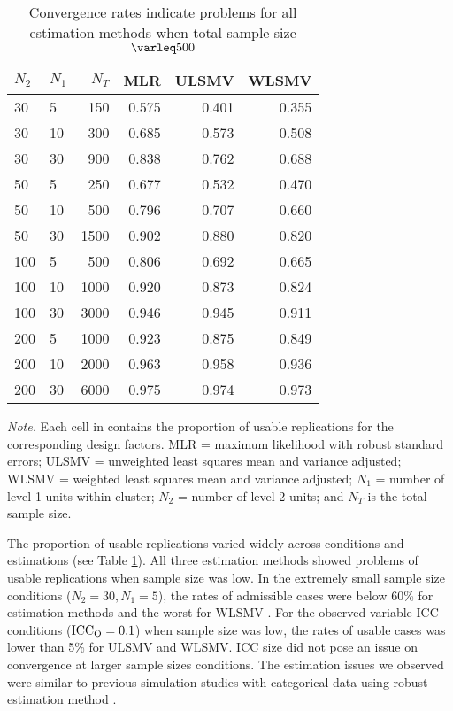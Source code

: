 \documentclass[Review,sageh,times, doublespace]{sagej}
\begin{document}
\begin{table}[ht]
 \centering
 \begin{threeparttable}
 \caption{Convergence rates indicate problems for all estimation methods when total sample size $\varleq 500$} 
 \label{tb:usable}
\begin{tabular}{llrrrr}
  \toprule
$N_2$ & $N_1$ & $N_T$ & MLR & ULSMV & WLSMV \\ 
  \midrule
   30 &    5 & 150  & 0.575 & 0.401 & 0.355 \\ 
   30 &   10 & 300  & 0.685 & 0.573 & 0.508 \\ 
   30 &   30 & 900  & 0.838 & 0.762 & 0.688 \\ 
   50 &    5 & 250  & 0.677 & 0.532 & 0.470 \\ 
   50 &   10 & 500  & 0.796 & 0.707 & 0.660 \\ 
   50 &   30 & 1500 & 0.902 & 0.880 & 0.820 \\ 
  100 &    5 & 500  & 0.806 & 0.692 & 0.665 \\ 
  100 &   10 & 1000 & 0.920 & 0.873 & 0.824 \\ 
  100 &   30 & 3000 & 0.946 & 0.945 & 0.911 \\ 
  200 &    5 & 1000 & 0.923 & 0.875 & 0.849 \\ 
  200 &   10 & 2000 & 0.963 & 0.958 & 0.936 \\ 
  200 &   30 & 6000 & 0.975 & 0.974 & 0.973 \\ 
   \bottomrule
\end{tabular}
 \vspace*{1mm}
 	\begin{tablenotes}
    {\small
        \textit{Note.} Each cell in contains the proportion of usable replications for the corresponding design factors. MLR = maximum likelihood with robust standard errors; ULSMV = unweighted least squares mean and variance adjusted; WLSMV = weighted least squares mean and variance adjusted; $N_1$ = number of level-1 units within cluster; $N_2$ = number of level-2 units; and $N_T$ is the total sample size.
    }
 	\end{tablenotes}
 \end{threeparttable}
\end{table}
 
The proportion of usable replications varied widely across conditions and estimations (see Table \ref{tb:usable}). 
All three estimation methods showed problems of usable replications when sample size was low.
In the extremely small sample size conditions ($N_2=30, N_1=5$), the rates of admissible cases were below 60\% for estimation methods and the worst for WLSMV .
For the observed variable ICC conditions ($\rm ICC_{O}=0.1$) when sample size was low, the rates of usable cases was lower than 5\% for ULSMV and WLSMV.
ICC size did not pose an issue on convergence at larger sample sizes conditions.
The estimation issues we observed were similar to previous simulation studies with categorical data using robust estimation method \citep{DiStefano2014, Hsu2015, Depaoli2015}. 
 
\end{document}

